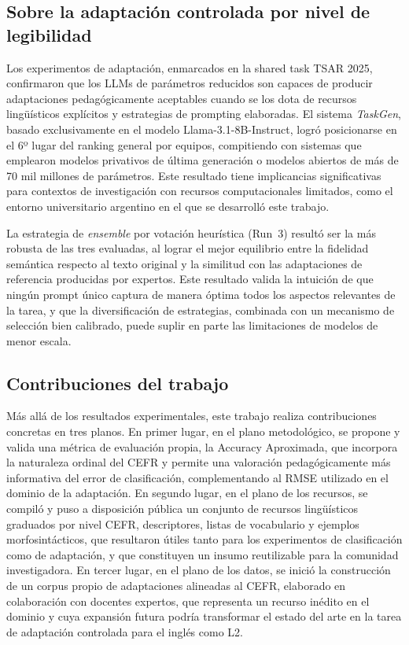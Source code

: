 \subsection*{Sobre la adaptación controlada por nivel de legibilidad}

Los experimentos de adaptación, enmarcados en la shared task TSAR 2025, confirmaron que los LLMs de parámetros reducidos son capaces de producir adaptaciones pedagógicamente aceptables cuando se los dota de recursos lingüísticos explícitos y estrategias de prompting elaboradas. El sistema \textit{TaskGen}, basado exclusivamente en el modelo Llama-3.1-8B-Instruct, logró posicionarse en el 6º lugar del ranking general por equipos, compitiendo con sistemas que emplearon modelos privativos de última generación o modelos abiertos de más de 70 mil millones de parámetros. Este resultado tiene implicancias significativas para contextos de investigación con recursos computacionales limitados, como el entorno universitario argentino en el que se desarrolló este trabajo.

La estrategia de \textit{ensemble} por votación heurística (Run~3) resultó ser la más robusta de las tres evaluadas, al lograr el mejor equilibrio entre la fidelidad semántica respecto al texto original y la similitud con las adaptaciones de referencia producidas por expertos. Este resultado valida la intuición de que ningún prompt único captura de manera óptima todos los aspectos relevantes de la tarea, y que la diversificación de estrategias, combinada con un mecanismo de selección bien calibrado, puede suplir en parte las limitaciones de modelos de menor escala.

\subsection*{Contribuciones del trabajo}

Más allá de los resultados experimentales, este trabajo realiza contribuciones concretas en tres planos. En primer lugar, en el plano metodológico, se propone y valida una métrica de evaluación propia, la Accuracy Aproximada, que incorpora la naturaleza ordinal del CEFR y permite una valoración pedagógicamente más informativa del error de clasificación, complementando al RMSE utilizado en el dominio de la adaptación. En segundo lugar, en el plano de los recursos, se compiló y puso a disposición pública un conjunto de recursos lingüísticos graduados por nivel CEFR, descriptores, listas de vocabulario y ejemplos morfosintácticos, que resultaron útiles tanto para los experimentos de clasificación como de adaptación, y que constituyen un insumo reutilizable para la comunidad investigadora. En tercer lugar, en el plano de los datos, se inició la construcción de un corpus propio de adaptaciones alineadas al CEFR, elaborado en colaboración con docentes expertos, que representa un recurso inédito en el dominio y cuya expansión futura podría transformar el estado del arte en la tarea de adaptación controlada para el inglés como L2.

